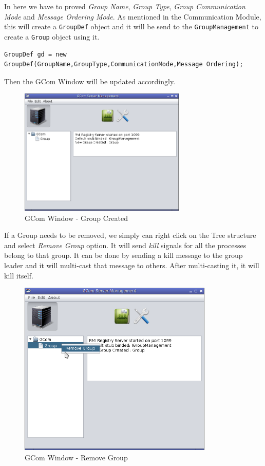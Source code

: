 \documentclass[a4paper,english,twoside]{article}
\begin{document}
In here we have to proved \textit{Group Name}, \textit{Group Type}, \textit{Group Communication Mode} and \textit{Message Ordering Mode}. As mentioned in the Communication Module, this will create a \texttt{GroupDef} object and it will be send to the \texttt{GroupManagement} to create a \texttt{Group} object using it.

{ \begin{lstlisting}
GroupDef gd = new GroupDef(GroupName,GroupType,CommunicationMode,Message Ordering);
\end{lstlisting}}
\noindent
Then the GCom Window will be updated accordingly.

\begin{figure}[h]
\begin{center}
\includegraphics[width=300px]{GCom-2.png}
\caption{GCom Window - Group Created}
\end{center}
\end{figure}
\newpage

If a Group needs to be removed, we simply can right click on the Tree structure and select \textit{Remove Group} option. It will send \textit{kill} signals for all the processes belong to that group. It can be done by sending a kill message to the group leader and it will multi-cast that message to others. After multi-casting it, it will kill itself.
\begin{figure}[h]
\begin{center}
\includegraphics[width=350px]{GCom-RemoveGroup.png}
\caption{GCom Window - Remove Group}
\end{center}
\end{figure}
\end{document}
